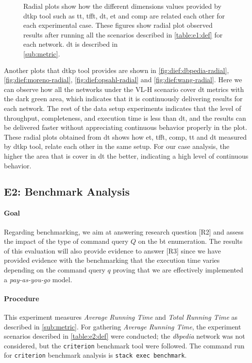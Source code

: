 \begin{figure}[!htp]
\begin{subfigure}[t]{0.45\textwidth}
    \label{fig:dief:wang-radial}
  \end{subfigure}
  \caption[{[EE] \acrshort{dt} General Results (Radial)}]{Radial plots show how the different dimensions values provided by \acrshort{dtkp} tool such as \acrshort{tt}, \acrshort{tfft}, \acrshort{dt}, \acrshort{et} and \acrshort{comp} are related each other for each experimental case. These figures show radial plot observed results after running all the scenarios described in \autoref{table:e1:def} for each network. \acrshort{dt} is described in \\ \autoref{sub:metric}.}
\end{figure}

Another plots that \acrshort{dtkp} tool provides are shown in \autoref{fig:dief:dbpedia-radial}, \autoref{fig:dief:moreno-radial}, \autoref{fig:dief:opsahl-radial} and \autoref{fig:dief:wang-radial}.
Here we can observe how all the networks under the VL-H scenario cover \acrshort{dt} metrics with the dark green area, which indicates that it is continuously delivering results for each network. 
The rest of the data setup experiments indicates that the level of throughput, completeness, and execution time is less than \acrlong{dt}, and the results can be delivered faster without appreciating continuous behavior properly in the plot. 
These radial plots obtained from \acrshort{dt} shows how \acrshort{et}, \acrshort{tfft}, \acrshort{comp}, \acrshort{tt} and \acrshort{dt} measured by \acrshort{dtkp} tool, relate each other in the same setup. 
For our case analysis, the higher the area that is cover in \acrlong{dt} the better, indicating a high level of continuous behavior.

\subsection{E2: Benchmark Analysis}\label{sub:sec:exp-2} 
\paragraph{Goal} Regarding benchmarking, we aim at answering research question [R2] and assess  the impact of the type of command query $Q$ on the  \acrshort{bt} enumeration.
The results of this evaluation will also provide evidence to answer [R3] since we have provided evidence with the benchmarking that the execution time varies depending on the command query $q$ proving that we are effectively implemented a \emph{pay-as-you-go} model. 

\paragraph{Procedure} This experiment measures \emph{Average Running Time} and \emph{Total Running Time} as  described in \autoref{sub:metric}. 
For gathering \emph{Average Running Time}, the experiment scenarios described in \autoref{table:e2:def} were conducted; the \emph{\acrshort{dbpedia}} network was not considered, but the \texttt{criterion} \cite{criterion} benchmark tool were followed.
The command run for \texttt{criterion} benchmark analysis is \texttt{stack exec benchmark}. 

